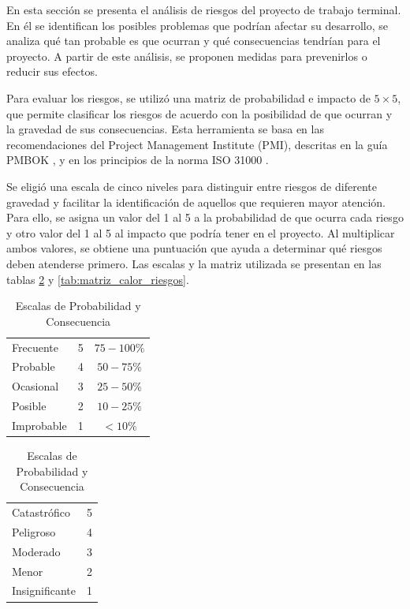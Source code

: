 

En esta sección se presenta el análisis de riesgos del proyecto de trabajo terminal. En él se identifican los posibles problemas que podrían afectar su desarrollo, se analiza qué tan probable es que ocurran y qué consecuencias tendrían para el proyecto. A partir de este análisis, se proponen medidas para prevenirlos o reducir sus efectos.

Para evaluar los riesgos, se utilizó una matriz de probabilidad e impacto de \(5 \times 5\), que permite clasificar los riesgos de acuerdo con la posibilidad de que ocurran y la gravedad de sus consecuencias. Esta herramienta se basa en las recomendaciones del Project Management Institute (PMI), descritas en la guía PMBOK \cite{pmbok2017}, y en los principios de la norma ISO 31000 \cite{iso31000}.

Se eligió una escala de cinco niveles para distinguir entre riesgos de diferente gravedad y facilitar la identificación de aquellos que requieren mayor atención. Para ello, se asigna un valor del 1 al 5 a la probabilidad de que ocurra cada riesgo y otro valor del 1 al 5 al impacto que podría tener en el proyecto. Al multiplicar ambos valores, se obtiene una puntuación que ayuda a determinar qué riesgos deben atenderse primero. Las escalas y la matriz utilizada se presentan en las tablas \ref{tab:escalas_riesgo} y \ref{tab:matriz_calor_riesgos}.

\begin{table}[htbp]
\centering
\caption{Escalas de Probabilidad y Consecuencia}
\label{tab:escalas_riesgo}
\begin{minipage}{0.45\textwidth}
    \centering
    \begin{tabular}{|l|c|c|}
    \hline
    \rowcolor{blue!20}
    \multicolumn{3}{|c|}{\textbf{Matriz de Probabilidad}} \\ \hline
    Frecuente & 5 & $75 - 100\%$ \\ \hline
    Probable & 4 & $50 - 75\%$ \\ \hline
    Ocasional & 3 & $25 - 50\%$ \\ \hline
    Posible & 2 & $10 - 25\%$ \\ \hline
    Improbable & 1 & $< 10\%$ \\ \hline
    \end{tabular}
\end{minipage}\hfill
\begin{minipage}{0.45\textwidth}
    \centering
    \begin{tabular}{|l|c|}
    \hline
    \rowcolor{blue!20}
    \multicolumn{2}{|c|}{\textbf{Matriz de Consecuencia}} \\ \hline
    Catastrófico & 5 \\ \hline
    Peligroso & 4 \\ \hline
    Moderado & 3 \\ \hline
    Menor & 2 \\ \hline
    Insignificante & 1 \\ \hline
    \end{tabular}
\end{minipage}
\end{table}


